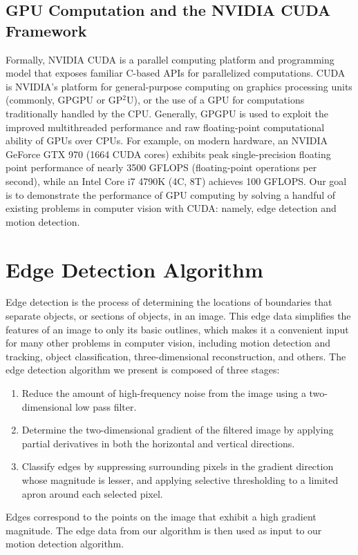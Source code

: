 \documentclass[journal]{IEEEtran}
\begin{document}
\subsection{GPU Computation and the NVIDIA CUDA Framework}
Formally, NVIDIA CUDA is a parallel computing platform and programming model that exposes familiar C-based APIs for parallelized computations. CUDA is NVIDIA's platform for general-purpose computing on graphics processing units (commonly, GPGPU or GP$^2$U), or the use of a GPU for computations traditionally handled by the CPU. Generally, GPGPU is used to exploit the improved multithreaded performance and raw floating-point computational ability of GPUs over CPUs. For example, on modern hardware, an NVIDIA GeForce GTX 970 (1664 CUDA cores) exhibits peak single-precision floating point performance of nearly 3500 GFLOPS (floating-point operations per second), while an Intel Core i7 4790K (4C, 8T) achieves 100 GFLOPS. Our goal is to demonstrate the performance of GPU computing by solving a handful of existing problems in computer vision with CUDA: namely, edge detection and motion detection.


\section{Edge Detection Algorithm}
Edge detection is the process of determining the locations of boundaries that separate objects, or sections of objects, in an image. This edge data simplifies the features of an image to only its basic outlines, which makes it a convenient input for many other problems in computer vision, including motion detection and tracking, object classification, three-dimensional reconstruction, and others. The edge detection algorithm we present is composed of three stages:
\begin{enumerate}
	\item Reduce the amount of high-frequency noise from the image using a two-dimensional low pass filter.
	\item Determine the two-dimensional gradient of the filtered image by applying partial derivatives in both the horizontal and vertical directions.
	\item Classify edges by suppressing surrounding pixels in the gradient direction whose magnitude is lesser, and applying selective thresholding to a limited apron around each selected pixel.
\end{enumerate}
Edges correspond to the points on the image that exhibit a high gradient magnitude. The edge data from our algorithm is then used as input to our motion detection algorithm.
\end{document}
